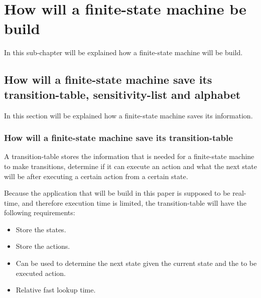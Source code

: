 \hypertarget{how-will-a-finite-state-machine-be-build}{%
\section{How will a finite-state machine be
build}\label{how-will-a-finite-state-machine-be-build}}

In this sub-chapter will be explained how a finite-state machine will be
build.

\hypertarget{how-will-a-finite-state-machine-save-its-transition-table-sensitivity-list-and-alphabet}{%
\subsection{How will a finite-state machine save its transition-table,
sensitivity-list and
alphabet}\label{how-will-a-finite-state-machine-save-its-transition-table-sensitivity-list-and-alphabet}}

In this section will be explained how a finite-state machine saves its
information.

\hypertarget{how-will-a-finite-state-machine-save-its-transition-table}{%
\subsubsection{How will a finite-state machine save its
transition-table}\label{how-will-a-finite-state-machine-save-its-transition-table}}

A transition-table stores the information that is needed for a
finite-state machine to make transitions, determine if it can execute an
action and what the next state will be after executing a certain action
from a certain state.

Because the application that will be build in this paper is supposed to
be real-time, and therefore execution time is limited, the
transition-table will have the following requirements:

\begin{itemize}
\tightlist
\item
  Store the states.
\item
  Store the actions.
\item
  Can be used to determine the next state given the current state and
  the to be executed action.
\item
  Relative fast lookup time.
\end{itemize}

